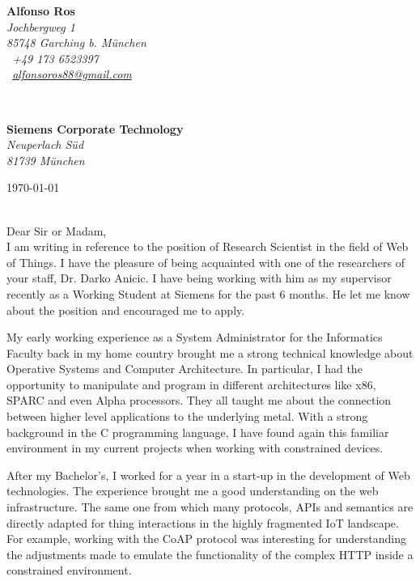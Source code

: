 \documentclass[10pt]{article}
\begin{document}
\sffamily   %
\hfill%
\begin{minipage}[t]{.6\textwidth}
\raggedleft%
{\bfseries Alfonso Ros}\\[.35ex]
\small\itshape%
Jochbergweg 1\\
85748 Garching b. M\"unchen\\[.35ex]
\Telefon~+49 173 6523397\\
\Letter~\href{mailto:alfonso.ros.88@gmail.com}{alfonsoros88@gmail.com}

\end{minipage}\\[1em]
%
\begin{minipage}[t]{.4\textwidth}
\raggedright%
{\bfseries Siemens Corporate Technology}\\[.35ex]
\small\itshape%
Neuperlach S\"ud\\
81739 M\"unchen
\end{minipage}
\hfill %
\begin{minipage}[t]{.4\textwidth}
\raggedleft %
\today
\end{minipage}\\[2em]

Dear Sir or Madam,\\[.5em]

I am writing in reference to the position of Research Scientist in the field of 
Web of Things. I have the pleasure of being acquainted with one of the 
researchers of your staff, Dr. Darko Anicic. I have being working with him as 
my supervisor recently as a Working Student at Siemens for the past 6 
months. He let me know about the position and encouraged me to apply.

My early working experience as a System Administrator for the Informatics 
Faculty back in my home country brought me a strong technical knowledge about 
Operative Systems and Computer Architecture. In particular, I had the 
opportunity to manipulate and program in different architectures like x86, 
SPARC and even Alpha processors. They all taught me about the connection 
between higher level applications to the underlying metal. With a strong 
background in the C programming language, I have found again this familiar 
environment in my current projects when working with constrained devices.

After my Bachelor's, I worked for a year in a start-up in the development of 
Web technologies. The experience brought me a good understanding on the web 
infrastructure. The same one from which many protocols, APIs and semantics are 
directly adapted for thing interactions in the highly fragmented IoT landscape. 
For example, working with the CoAP protocol was interesting for understanding 
the adjustments made to emulate the functionality of the complex HTTP inside a 
constrained environment.
\end{document}
